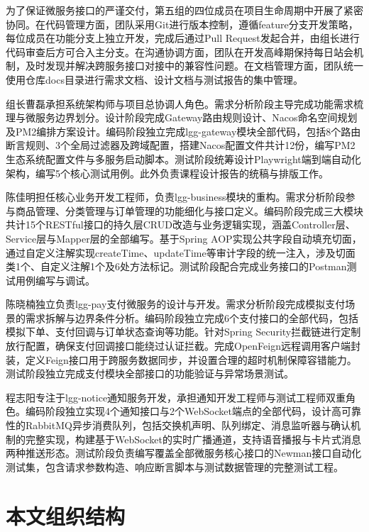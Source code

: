 为了保证微服务接口的严谨交付，第五组的四位成员在项目生命周期中开展了紧密协同。在代码管理方面，团队采用Git进行版本控制，遵循feature分支开发策略，每位成员在功能分支上独立开发，完成后通过Pull Request发起合并，由组长进行代码审查后方可合入主分支。在沟通协调方面，团队在开发高峰期保持每日站会机制，及时发现并解决跨服务接口对接中的兼容性问题。在文档管理方面，团队统一使用仓库docs目录进行需求文档、设计文档与测试报告的集中管理。

组长曹磊承担系统架构师与项目总协调人角色。需求分析阶段主导完成功能需求梳理与微服务边界划分。设计阶段完成Gateway路由规则设计、Nacos命名空间规划及PM2编排方案设计。编码阶段独立完成lgg-gateway模块全部代码，包括8个路由断言规则、3个全局过滤器及跨域配置，搭建Nacos配置文件共计12份，编写PM2生态系统配置文件与多服务启动脚本。测试阶段统筹设计Playwright端到端自动化架构，编写5个核心测试用例。此外负责课程设计报告的统稿与排版工作。

陈佳明担任核心业务开发工程师，负责lgg-business模块的重构。需求分析阶段参与商品管理、分类管理与订单管理的功能细化与接口定义。编码阶段完成三大模块共计15个RESTful接口的持久层CRUD改造与业务逻辑实现，涵盖Controller层、Service层与Mapper层的全部编写。基于Spring AOP实现公共字段自动填充切面，通过自定义注解实现createTime、updateTime等审计字段的统一注入，涉及切面类1个、自定义注解1个及6处方法标记。测试阶段配合完成业务接口的Postman测试用例编写与调试。

陈晓楠独立负责lgg-pay支付微服务的设计与开发。需求分析阶段完成模拟支付场景的需求拆解与边界条件分析。编码阶段独立完成6个支付接口的全部代码，包括模拟下单、支付回调与订单状态查询等功能。针对Spring Security拦截链进行定制放行配置，确保支付回调接口能绕过认证拦截。完成OpenFeign远程调用客户端封装，定义Feign接口用于跨服务数据同步，并设置合理的超时机制保障容错能力。测试阶段独立完成支付模块全部接口的功能验证与异常场景测试。

程志阳专注于lgg-notice通知服务开发，承担通知开发工程师与测试工程师双重角色。编码阶段独立实现4个通知接口与2个WebSocket端点的全部代码，设计高可靠性的RabbitMQ异步消费队列，包括交换机声明、队列绑定、消息监听器与确认机制的完整实现，构建基于WebSocket的实时广播通道，支持语音播报与卡片式消息两种推送形态。测试阶段负责编写覆盖全部微服务核心接口的Newman接口自动化测试集，包含请求参数构造、响应断言脚本与测试数据管理的完整测试工程。

\section{本文组织结构}

